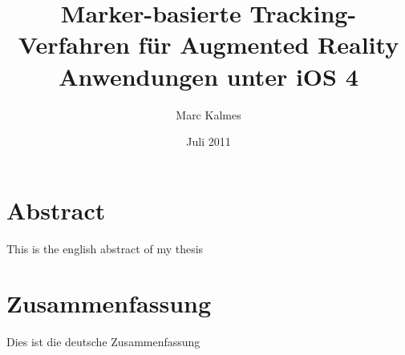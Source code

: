 %
%




\frontmatter

\ifpdf
{}
\else
{}
\fi

\titlehead{Fachhochschule Köln\\ Fakultät für Informatik und Ingenieurwissenschaften}
\subject{Diplomarbeit}
\title{Marker-basierte Tracking-Verfahren für Augmented Reality Anwendungen unter iOS 4}
\author{Marc Kalmes}
\date{Juli 2011}
\publishers{betreut durch Prof. Dr. Heiner Klocke}

\maketitle

\chapter*{Abstract} %
\label{cha:abstract}
This is the english abstract of my thesis
\chapter*{Zusammenfassung} %
\label{cha:abstract-deu}
Dies ist die deutsche Zusammenfassung

\tableofcontents

\mainmatter


\nocite{*}

%
\appendix

\backmatter

\printbibliography[]



